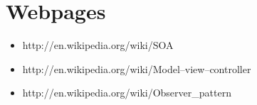\section{Webpages}
\begin{itemize}
\item http://en.wikipedia.org/wiki/SOA
\item http://en.wikipedia.org/wiki/Model–view–controller
\item http://en.wikipedia.org/wiki/Observer\_pattern
\end{itemize}

